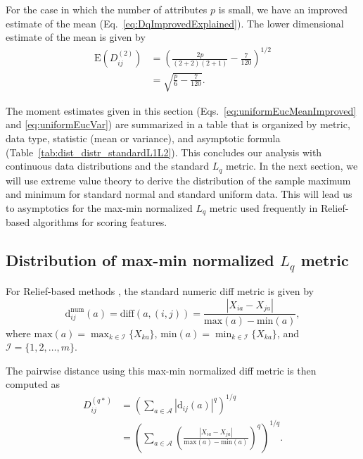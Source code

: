 \documentclass[aoas]{imsart}
\begin{document}
For the case in which the number of attributes $p$ is small, we have an improved estimate of the mean (Eq.~\ref{eq:DqImprovedExplained}). The lower dimensional estimate of the mean is given by
%
\begin{equation}\label{eq:uniformEucMeanImproved}
\begin{aligned}
\text{E}\left(D^{(2)}_{ij}\right) &= \left(\frac{2p}{(2+2)(2+1)} - \frac{7}{120}\right)^{1/2} \\
&= \sqrt{\frac{p}{6} - \frac{7}{120}}.
\end{aligned}
\end{equation}

The moment estimates given in this section (Eqs.~\ref{eq:uniformEucMeanImproved} and \ref{eq:uniformEucVar}) are summarized in a table that is organized by metric, data type, statistic (mean or variance), and asymptotic formula (Table~\ref{tab:dist_distr_standardL1L2}). This concludes our analysis with continuous data distributions and the standard $L_q$ metric. In the next section, we will use extreme value theory to derive the distribution of the sample maximum and minimum for standard normal and standard uniform data. This will lead us to asymptotics for the max-min normalized $L_q$ metric used frequently in Relief-based algorithms \cite{urbanowicz17,robnik2003} for scoring features.

\subsection{Distribution of max-min normalized \texorpdfstring{$L_q$}{} metric}\label{sec:extremes}

For Relief-based methods \cite{robnik2003,urbanowicz17}, the standard numeric diff metric is given by
%
\begin{equation}\label{eq:normDiff}
\text{d}^{\text{num}}_{ij}(a) = \text{diff}(a,(i,j)) = \frac{|X_{ia} - X_{ja}|}{\text{max}(a) - \text{min}(a)},
\end{equation}
%
where $\text{max}(a) = \displaystyle \max_{k \in \mathcal{I}}\{X_{ka}\}$, $\text{min}(a) = \displaystyle \min_{k \in \mathcal{I}}\{X_{ka}\}$, and $\mathcal{I} = \{1,2,\dots,m\}$. 

The pairwise distance using this max-min normalized diff metric is then computed as
%
\begin{equation}\label{eq:D*}
\begin{aligned}
D^{(q*)}_{ij} &= \left(\sum_{a\in \mathcal{A}}|\text{d}_{ij}(a)|^q\right)^{1/q} \\
&= \left(\sum_{a\in \mathcal{A}}\left(\frac{|X_{ia} - X_{ja}|}{\text{max}(a) - \text{min}(a)}\right)^q\right)^{1/q}.
\end{aligned}
\end{equation}
\end{document}
